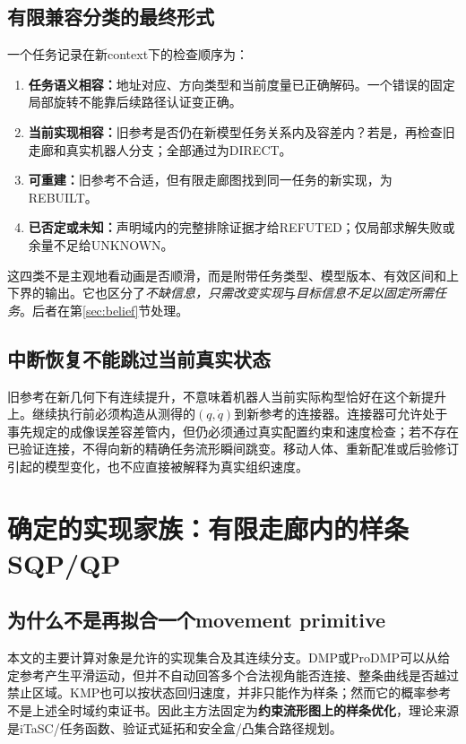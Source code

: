 \documentclass[UTF8,11pt,a4paper,fontset=fandol]{ctexart}
\numberwithin{equation}{section}
\theoremstyle{definition}
\begin{document}
\subsection{有限兼容分类的最终形式}
一个任务记录在新context下的检查顺序为：
\begin{enumerate}
\item \textbf{任务语义相容：}地址对应、方向类型和当前度量已正确解码。一个错误的固定局部旋转不能靠后续路径认证变正确。
\item \textbf{当前实现相容：}旧参考是否仍在新模型任务关系内及容差内？若是，再检查旧走廊和真实机器人分支；全部通过为DIRECT。
\item \textbf{可重建：}旧参考不合适，但有限走廊图找到同一任务的新实现，为REBUILT。
\item \textbf{已否定或未知：}声明域内的完整排除证据才给REFUTED；仅局部求解失败或余量不足给UNKNOWN。
\end{enumerate}
这四类不是主观地看动画是否顺滑，而是附带任务类型、模型版本、有效区间和上下界的输出。它也区分了\emph{不缺信息，只需改变实现}与\emph{目标信息不足以固定所需任务}。后者在第\ref{sec:belief}节处理。

\subsection{中断恢复不能跳过当前真实状态}
旧参考在新几何下有连续提升，不意味着机器人当前实际构型恰好在这个新提升上。继续执行前必须构造从测得的$(q,\dot q)$到新参考的连接器。连接器可允许处于事先规定的成像误差容差管内，但仍必须通过真实配置约束和速度检查；若不存在已验证连接，不得向新的精确任务流形瞬间跳变。移动人体、重新配准或后验修订引起的模型变化，也不应直接被解释为真实组织速度。

\section{确定的实现家族：有限走廊内的样条SQP/QP}
\subsection{为什么不是再拟合一个movement primitive}
本文的主要计算对象是允许的实现集合及其连续分支。DMP或ProDMP可以从给定参考产生平滑运动，但并不自动回答多个合法视角能否连接、整条曲线是否越过禁止区域。KMP也可以按状态回归速度，并非只能作为样条；然而它的概率参考不是上述全时域约束证书\cite{kmp2018}。因此主方法固定为\textbf{约束流形图上的样条优化}，理论来源是iTaSC/任务函数、验证式延拓和安全盒/凸集合路径规划\cite{itasc2007,cuik2014,safebox2024,gcs2024}。
\end{document}
